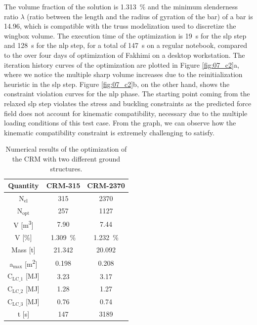     The volume fraction of the solution is \qty{1.313}{\percent} and the minimum slenderness ratio $\lambda$ (ratio between the length and the radius of gyration of the bar) of a bar is 14.96, which is compatible with the truss modelization used to discretize the wingbox volume. The execution time of the optimization is \qty{19}{s} for the \gls{slp} step and \qty{128}{s} for the \gls{nlp} step, for a total of \qty{147}{s} on a regular notebook, compared to the over four days of optimization of Fakhimi \cite{fakhimi_discrete_2021} on a desktop workstation. The iteration history curves of the optimization are plotted in Figure \ref{fig:07_c2}a, where we notice the multiple sharp volume increases due to the reinitialization heuristic in the \gls{slp} step. Figure \ref{fig:07_c2}b, on the other hand, shows the constraint violation curves for the \gls{nlp} phase. The starting point coming from the relaxed \gls{slp} step violates the stress and buckling constraints as the predicted force field does not account for kinematic compatibility, necessary due to the multiple loading conditions of this test case. From the graph, we can observe how the kinematic compatibility constraint is extremely challenging to satisfy.

    \begin{table}
        \small
        \centering
        \begin{tabular}{ccc}
        \toprule
        \textbf{Quantity} & \textbf{CRM-315} & \textbf{CRM-2370} \\ \midrule
        N$_{\text{el}}$          & 315               & 2370               \\
        N$_{\text{opt}}$           & 257                  &  1127              \\
        V [\unit{\meter^3}]             &  7.90                 &  7.44             \\
        V [\unit{\%}]             &   \qty{1.309}{\%}                & \qty{1.232}{\%}               \\
        Mass [\unit{\tonne}]               &   21.342                & 20.092     \\
        a$_{\text{max}}$ [\unit{\meter^2}]           &  0.198                 & 0.208              \\
        C$_\text{LC\_1}$ [\unit{\mega \joule}]                &  3.23                 &  3.17              \\
        C$_\text{LC\_2}$ [\unit{\mega \joule}]                &   1.28                &  1.27              \\
        C$_\text{LC\_3}$ [\unit{\mega \joule}]                &   0.76                &  0.74              \\
        t [\unit{\second}]                & 147                  & 3189   \\ \bottomrule            
        \end{tabular}
        \caption{Numerical results of the optimization of the CRM with two different ground structures.}
        \label{tab:07_wing-res}
    \end{table}

